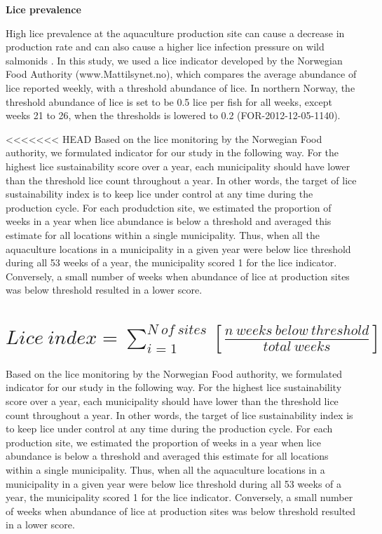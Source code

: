 \documentclass[
]{book}
\begin{document}
\textbf{Lice prevalence}

High lice prevalence at the aquaculture production site can cause a decrease in production rate and can also cause a higher lice infection pressure on wild salmonids \citep{bjorn2001salmon, nilsen2017vurdering}.
In this study, we used a lice indicator developed by the Norwegian Food Authority (www.Mattilsynet.no), which compares the average abundance of lice reported weekly, with a threshold abundance of lice. In northern Norway, the threshold abundance of lice is set to be 0.5 lice per fish for all weeks, except weeks 21 to 26, when the thresholds is lowered to 0.2 (FOR-2012-12-05-1140).

\textless\textless\textless\textless\textless\textless\textless{} HEAD
Based on the lice monitoring by the Norwegian Food authority, we formulated indicator for our study in the following way. For the highest lice sustainability score over a year, each municipality should have lower than the threshold lice count throughout a year. In other words, the target of lice sustainability index is to keep lice under control at any time during the production cycle. For each produdction site, we estimated the proportion of weeks in a year when lice abundance is below a threshold and averaged this estimate for all locations within a single municipality. Thus, when all the aquaculture locations in a municipality in a given year were below lice threshold during all 53 weeks of a year, the municipality scored 1 for the lice indicator. Conversely, a small number of weeks when abundance of lice at production sites was below threshold resulted in a lower score.

\hypertarget{lice-index-sum_i-1n-of-sitesfracn-weeks-below_-thresholdtotal-weeks}{%
\chapter{\texorpdfstring{\(Lice \ index = \sum_{i = 1}^{N \ of \ sites}[\frac{n \ weeks\ below_ \ threshold}{total\ weeks}]\)}{Lice \textbackslash{} index = \textbackslash sum\_\{i = 1\}\^{}\{N \textbackslash{} of \textbackslash{} sites\}{[}\textbackslash frac\{n \textbackslash{} weeks\textbackslash{} below\_ \textbackslash{} threshold\}\{total\textbackslash{} weeks\}{]}}}\label{lice-index-sum_i-1n-of-sitesfracn-weeks-below_-thresholdtotal-weeks}}

Based on the lice monitoring by the Norwegian Food authority, we formulated indicator for our study in the following way. For the highest lice sustainability score over a year, each municipality should have lower than the threshold lice count throughout a year. In other words, the target of lice sustainability index is to keep lice under control at any time during the production cycle. For each production site, we estimated the proportion of weeks in a year when lice abundance is below a threshold and averaged this estimate for all locations within a single municipality. Thus, when all the aquaculture locations in a municipality in a given year were below lice threshold during all 53 weeks of a year, the municipality scored 1 for the lice indicator. Conversely, a small number of weeks when abundance of lice at production sites was below threshold resulted in a lower score.
\end{document}
